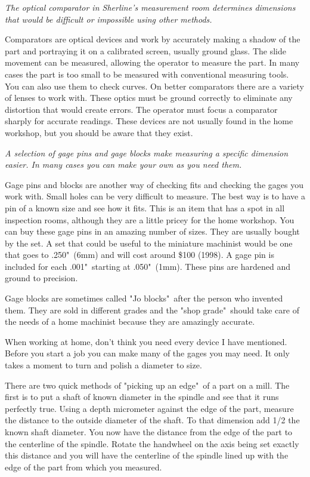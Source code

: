 
\bigskip
\textit{The optical comparator in Sherline's measurement room determines
dimensions that would be difficult or impossible using other methods.}
\bigskip

Comparators are optical devices and work by accurately making a shadow of the
part and portraying it on a calibrated screen, usually ground glass. The slide
movement can be measured, allowing the operator to measure the part. In many
cases the part is too small to be measured with conventional measuring tools.
You can also use them to check curves. On better comparators there are a variety
of lenses to work with. These optics must be ground correctly to eliminate any
distortion that would create errors. The operator must focus a comparator
sharply for accurate readings. These devices are not usually found in the home
workshop, but you should be aware that they exist.

\bigskip
\textit{A selection of gage pins and gage blocks make measuring a specific
dimension easier. In many cases you can make your own as you need them.}
\bigskip


Gage pins and blocks are another way of checking fits and checking the gages you
work with. Small holes can be very difficult to measure. The best way is to have
a pin of a known size and see how it fits. This is an item that has a spot in
all inspection rooms, although they are a little pricey for the home workshop.
You can buy these gage pins in an amazing number of sizes. They are usually
bought by the set. A set that could be useful to the miniature machinist would
be one that goes to .250"\ (6mm) and will cost around \$100 (1998). A gage pin is
included for each .001"\ starting at .050"\ (1mm). These pins are hardened and
ground to precision.

Gage blocks are sometimes called "Jo blocks"\ after the person who invented them.
They are sold in different grades and the "shop grade"\ should take care of the
needs of a home machinist because they are amazingly accurate.

When working at home, don't think you need every device I have mentioned. Before
you start a job you can make many of the gages you may need. It only takes a
moment to turn and polish a diameter to size.


There are two quick methods of "picking up an edge"\ of a part on a mill. The
first is to put a shaft of known diameter in the spindle and see that it runs
perfectly true. Using a depth micrometer against the edge of the part, measure
the distance to the outside diameter of the shaft. To that dimension add 1/2 the
known shaft diameter. You now have the distance from the edge of the part to the
centerline of the spindle. Rotate the handwheel on the axis being set exactly
this distance and you will have the centerline of the spindle lined up with the
edge of the part from which you measured.

